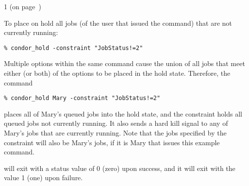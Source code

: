 \begin{ManPage}{\label{man-condor-hold}}{1}
\SeeAlso
{} (on page~\pageref{man-condor-release})

\Examples
To place on hold all jobs
(of the user that issued the  command)
that are not currently running:
\footnotesize
\begin{verbatim}
% condor_hold -constraint "JobStatus!=2"
\end{verbatim}
\normalsize

Multiple options within the same command cause the union of 
all jobs that meet either (or both) of the options to be placed in the
hold state.
Therefore, the command
\footnotesize
\begin{verbatim}
% condor_hold Mary -constraint "JobStatus!=2"
\end{verbatim}
\normalsize
places all of Mary's queued jobs into the hold state, 
and the constraint holds all queued jobs not currently running.
It also sends a hard kill signal to any of Mary's jobs that are
currently running.
Note that the jobs specified by the constraint will also be
Mary's jobs, if it is Mary that issues this
example  command.

\ExitStatus

 will exit with a status value of 0 (zero) upon success,
and it will exit with the value 1 (one) upon failure.

\end{ManPage}
